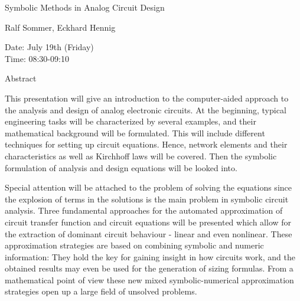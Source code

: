 \begin{center}
\LARGE
Symbolic Methods in Analog Circuit Design
\end{center}

\begin{center}
\Large
Ralf Sommer, Eckhard Hennig

\end{center}

\noindent
Date:  July 19th (Friday)\\
Time:  08:30-09:10\\

\begin{center}
\large
Abstract
\end{center}

This presentation will give an introduction to the computer-aided approach to the analysis and
design of analog electronic circuits. At the beginning, typical engineering tasks will be
characterized by several examples, and their mathematical background will be formulated. This
will include different techniques for setting up circuit equations. Hence, network elements and
their characteristics as well as Kirchhoff laws will be covered. Then the symbolic formulation of
analysis and design equations will be looked into. 

Special attention will be attached to the problem of solving the equations since the explosion of
terms in the solutions is the main problem in symbolic circuit analysis. Three fundamental
approaches for the automated approximation of circuit transfer function and circuit equations will
be presented which allow for the extraction of dominant circuit behaviour - linear and even
nonlinear. These approximation strategies are based on combining symbolic and numeric
information: They hold the key for gaining insight in how circuits work, and the obtained results
may even be used for the generation of sizing formulas. From a mathematical point of view these
new mixed symbolic-numerical approximation strategies open up a large field of unsolved
problems. 


